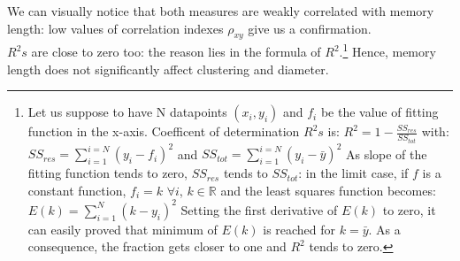 We can visually notice that both measures are weakly correlated with
memory length: low values of correlation indexes
$\rho_{xy}$ give us a confirmation.\\
$R^2s$ are close to zero too: the reason lies in the  formula
of $R^2$.\footnote{Let us suppose to have N datapoints
$(x_i,y_i)$ and $f_i$ be the
value of fitting function in the x-axis. Coefficent of determination
$R^2s$ is: $R^{2}= 1-{\frac {SS_{ res}}  {SS_{ tot}}}$
with:
$SS_{ res}=\sum_{i=1}^{i=N}{(y_i - f_i)^2}$
and
$SS_{ tot}=\sum_{i=1}^{i=N}{(y_i - \bar{y})^2}$
As slope of the fitting function tends to zero, $SS_{res}$ tends
to $SS_{tot}$: in the limit case, if $f$ is a constant function,
$f_i=k$ $\forall  i$,  $k \in  \mathbb{R}$ and the least
squares function becomes: $E(k)= \sum_{i=1}^{N}{(k-y_i)^2} $
Setting the first derivative of $E(k)$ to zero, it can easily proved
that minimum of $E(k)$ is reached for $k=\bar{y}$.
As a consequence, the fraction gets closer to one and $R^2$ tends to zero.}
Hence, memory length does not significantly affect clustering and diameter.
